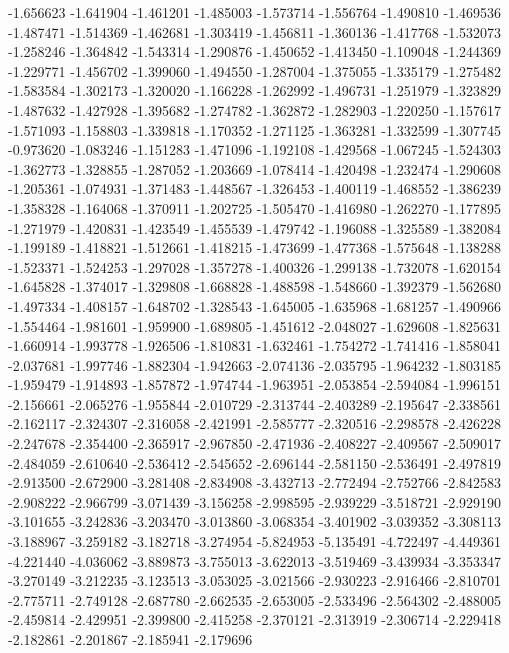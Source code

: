 -1.656623
-1.641904
-1.461201
-1.485003
-1.573714
-1.556764
-1.490810
-1.469536
-1.487471
-1.514369
-1.462681
-1.303419
-1.456811
-1.360136
-1.417768
-1.532073
-1.258246
-1.364842
-1.543314
-1.290876
-1.450652
-1.413450
-1.109048
-1.244369
-1.229771
-1.456702
-1.399060
-1.494550
-1.287004
-1.375055
-1.335179
-1.275482
-1.583584
-1.302173
-1.320020
-1.166228
-1.262992
-1.496731
-1.251979
-1.323829
-1.487632
-1.427928
-1.395682
-1.274782
-1.362872
-1.282903
-1.220250
-1.157617
-1.571093
-1.158803
-1.339818
-1.170352
-1.271125
-1.363281
-1.332599
-1.307745
-0.973620
-1.083246
-1.151283
-1.471096
-1.192108
-1.429568
-1.067245
-1.524303
-1.362773
-1.328855
-1.287052
-1.203669
-1.078414
-1.420498
-1.232474
-1.290608
-1.205361
-1.074931
-1.371483
-1.448567
-1.326453
-1.400119
-1.468552
-1.386239
-1.358328
-1.164068
-1.370911
-1.202725
-1.505470
-1.416980
-1.262270
-1.177895
-1.271979
-1.420831
-1.423549
-1.455539
-1.479742
-1.196088
-1.325589
-1.382084
-1.199189
-1.418821
-1.512661
-1.418215
-1.473699
-1.477368
-1.575648
-1.138288
-1.523371
-1.524253
-1.297028
-1.357278
-1.400326
-1.299138
-1.732078
-1.620154
-1.645828
-1.374017
-1.329808
-1.668828
-1.488598
-1.548660
-1.392379
-1.562680
-1.497334
-1.408157
-1.648702
-1.328543
-1.645005
-1.635968
-1.681257
-1.490966
-1.554464
-1.981601
-1.959900
-1.689805
-1.451612
-2.048027
-1.629608
-1.825631
-1.660914
-1.993778
-1.926506
-1.810831
-1.632461
-1.754272
-1.741416
-1.858041
-2.037681
-1.997746
-1.882304
-1.942663
-2.074136
-2.035795
-1.964232
-1.803185
-1.959479
-1.914893
-1.857872
-1.974744
-1.963951
-2.053854
-2.594084
-1.996151
-2.156661
-2.065276
-1.955844
-2.010729
-2.313744
-2.403289
-2.195647
-2.338561
-2.162117
-2.324307
-2.316058
-2.421991
-2.585777
-2.320516
-2.298578
-2.426228
-2.247678
-2.354400
-2.365917
-2.967850
-2.471936
-2.408227
-2.409567
-2.509017
-2.484059
-2.610640
-2.536412
-2.545652
-2.696144
-2.581150
-2.536491
-2.497819
-2.913500
-2.672900
-3.281408
-2.834908
-3.432713
-2.772494
-2.752766
-2.842583
-2.908222
-2.966799
-3.071439
-3.156258
-2.998595
-2.939229
-3.518721
-2.929190
-3.101655
-3.242836
-3.203470
-3.013860
-3.068354
-3.401902
-3.039352
-3.308113
-3.188967
-3.259182
-3.182718
-3.274954
-5.824953
-5.135491
-4.722497
-4.449361
-4.221440
-4.036062
-3.889873
-3.755013
-3.622013
-3.519469
-3.439934
-3.353347
-3.270149
-3.212235
-3.123513
-3.053025
-3.021566
-2.930223
-2.916466
-2.810701
-2.775711
-2.749128
-2.687780
-2.662535
-2.653005
-2.533496
-2.564302
-2.488005
-2.459814
-2.429951
-2.399800
-2.415258
-2.370121
-2.313919
-2.306714
-2.229418
-2.182861
-2.201867
-2.185941
-2.179696
